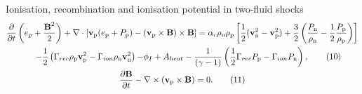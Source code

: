 \documentclass[10pt,aspectratio=169,usenames,dvipsnames]{beamer}
\begin{document}
\begin{frame}{Ionisation, recombination and ionisation potential in two-fluid shocks}
\begin{gather}
\frac{\partial}{\partial t} \left( e_{\text{p}} + \frac{\textbf{B}^2}{2} \right) + \nabla \cdot \left[ \textbf{v}_{\text{p}} ( e_{\text{p}} + P_{\text{p}}) -  (\textbf{v}_{\rm p} \times \textbf{B}) \times \textbf{B} \right]  =  \alpha _c \rho _{\text{n}} \rho _{\text{p}} \left[ \frac{1}{2} (\textbf{v}_{\text{n}} ^2 - \textbf{v}_{\text{p}} ^2)+ \frac{3}{2} \left(\frac{P_{\rm n}}{\rho_{\rm n}}-\frac{1}{2}\frac{P_{\rm p}}{\rho_{\rm p}}\right) \right] \nonumber \\ \hspace{0.5cm}- \frac{1}{2} \left( \Gamma _{rec} \rho _{\rm p} \textbf{v}_{\rm p} ^2 - \Gamma _{ion} \rho _{\rm n} \textbf{v}_{\rm n} ^2 \right) {- \phi_I + A_{heat}} -\frac{1}{ (\gamma-1)} \left( \frac{1}{2} \Gamma _{rec} P_{\rm p} -\Gamma _{ion} P_{\rm n} \right), \label{eqn:ep} \tag{10}\\
\frac{\partial \textbf{B}}{\partial t} - \nabla \times (\textbf{v}_{\text{p}} \times \textbf{B}) = 0.\tag{11}
\end{gather}
\end{frame}
\end{document}
